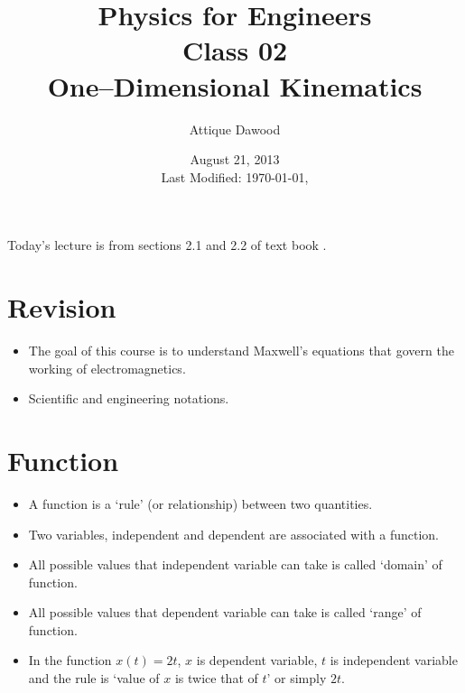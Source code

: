 \documentclass[12pt,a4paper]{article}
\title{\vspace{-2cm}Physics for Engineers\\Class 02\\One--Dimensional Kinematics}
\author{Attique Dawood}
\date{August 21, 2013\\[0.2cm] Last Modified: \today, \currenttime}
\begin{document}
\maketitle
Today's lecture is from sections 2.1 and 2.2 of text book \cite{Serway}.
\section{Revision}
\begin{itemize}
\item The goal of this course is to understand Maxwell's equations that govern the working of electromagnetics.
\item Scientific and engineering notations.
\end{itemize}
\section{Function}
\begin{itemize}
\item A function is a `rule' (or relationship) between two quantities.
\item Two variables, independent and dependent are associated with a function.
\item All possible values that independent variable can take is called `domain' of function.
\item All possible values that dependent variable can take is called `range' of function.
\item In the function $x(t)=2t$, $x$ is dependent variable, $t$ is independent variable and the rule is `value of $x$ is twice that of $t$' or simply $2t$.
\end{itemize}
\end{document}

